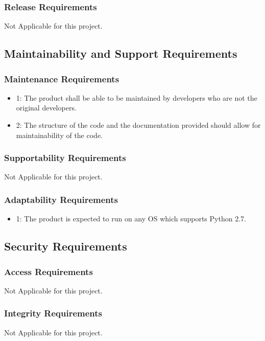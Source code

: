 \documentclass[12pt]{article}
\begin{document}
\subsubsection*{Release Requirements}
Not Applicable for this project.

\subsection{Maintainability and Support Requirements}

\subsubsection*{Maintenance Requirements}
\begin{itemize}
\item 1: The product shall be able to be maintained by developers who are not the original developers.
\item 2: The structure of the code and the documentation provided should allow for maintainability of the code.
\end{itemize}

\subsubsection*{Supportability Requirements}
Not Applicable for this project.

\subsubsection*{Adaptability Requirements}
\begin{itemize}
\item 1: The product is expected to run on any OS which supports Python 2.7.
\end{itemize}

\subsection{Security Requirements}

\subsubsection*{Access Requirements}
Not Applicable for this project.
\subsubsection*{Integrity Requirements}
Not Applicable for this project.
\end{document}
